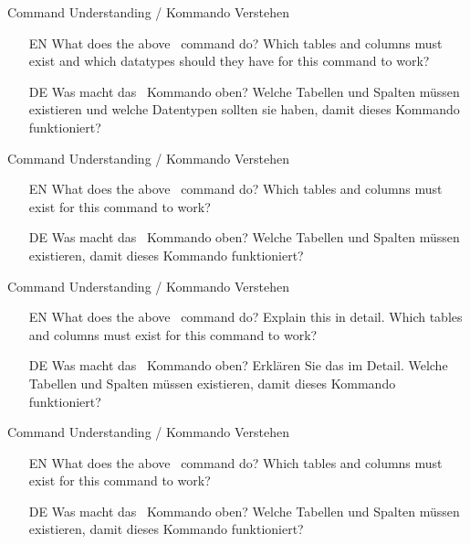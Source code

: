 %
%
\begin{question}{Command Understanding / Kommando Verstehen}%
%
%
\begin{itemize}%
\item[EN] What does the above \sqlDialect\ command do? %
Which tables and columns must exist and which datatypes should they have for this command to work?%
\item[DE] Was macht das \sqlDialect\ Kommando oben? %
Welche Tabellen und Spalten müssen existieren und welche Datentypen sollten sie haben, damit dieses Kommando funktioniert?%
\end{itemize}%
\end{question}%
%
%
\begin{question}{Command Understanding / Kommando Verstehen}%
%
%
\begin{itemize}%
\item[EN] What does the above \sqlDialect\ command do? %
Which tables and columns must exist for this command to work?%
\item[DE] Was macht das \sqlDialect\ Kommando oben? %
Welche Tabellen und Spalten müssen existieren, damit dieses Kommando funktioniert?%
\end{itemize}%
\end{question}%
%
%
\begin{question}{Command Understanding / Kommando Verstehen}%
%
%
\begin{itemize}%
\item[EN] What does the above \sqlDialect\ command do? %
Explain this in detail.%
Which tables and columns must exist for this command to work?%
\item[DE] Was macht das \sqlDialect\ Kommando oben? %
Erklären Sie das im Detail. %
Welche Tabellen und Spalten müssen existieren, damit dieses Kommando funktioniert?%
\end{itemize}%
\end{question}%
%
\begin{question}{Command Understanding / Kommando Verstehen}%
%
%
\begin{itemize}%
\item[EN] What does the above \sqlDialect\ command do? %
Which tables and columns must exist for this command to work?%
\item[DE] Was macht das \sqlDialect\ Kommando oben? %
Welche Tabellen und Spalten müssen existieren, damit dieses Kommando funktioniert?%
\end{itemize}%
\end{question}%
